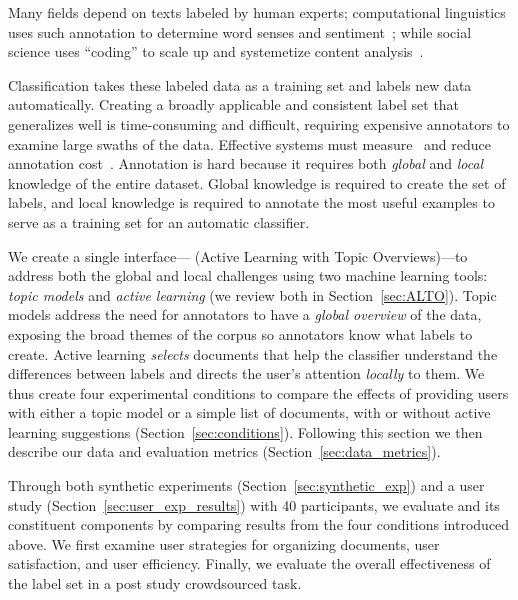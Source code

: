 Many fields depend on texts labeled by human experts; computational
linguistics uses such annotation to determine word senses and
sentiment~\cite{wordsense,sentiment}; while social science uses
``coding'' to scale up and systemetize content
analysis~\cite{policy_pref_Budge,policy_pref_Klingemann}.

Classification takes these labeled data as a training set and labels new data
automatically.  Creating a broadly applicable and consistent 
label set that generalizes well is time-consuming
and difficult, requiring expensive annotators to examine large swaths
of the data. Effective  systems must
measure~\cite{hwa2004sample,osborne2004ensemble,ngai2000rule} and
reduce annotation cost~\cite{tomanek2007approach}. Annotation is hard because it requires both \emph{global}
and \emph{local} knowledge of the entire dataset.  Global knowledge is
required to create the set of labels, and local knowledge is required
to annotate the most useful examples to serve as a training set for an
automatic classifier.

We create a single interface---\name{} (Active Learning with Topic
Overviews)---to address both the global and local challenges using two machine
learning tools: \emph{topic models} and \emph{active learning} (we review both
in Section~\ref{sec:ALTO}). Topic models address the need for annotators to have
a \emph{global overview} of the data, exposing the broad themes of the corpus so
annotators know what labels to create.  Active learning \emph{selects} documents that
help the classifier understand the differences between labels and directs
the user's attention \emph{locally} to them.  We thus create four experimental
conditions to compare the effects of providing users with either a topic model
or a simple list of documents, with or without active learning suggestions
(Section~\ref{sec:conditions}). Following this section we then describe our data
and evaluation metrics (Section~\ref{sec:data_metrics}).
















Through both synthetic experiments (Section~\ref{sec:synthetic_exp}) and a user
study (Section~\ref{sec:user_exp_results}) with 40 participants, we evaluate
\name{} and its constituent components by comparing results from the four
conditions introduced above.  We first examine user strategies for organizing
documents, user satisfaction, and user efficiency. Finally, we evaluate the overall effectiveness of the label set in a post study crowdsourced task. 




